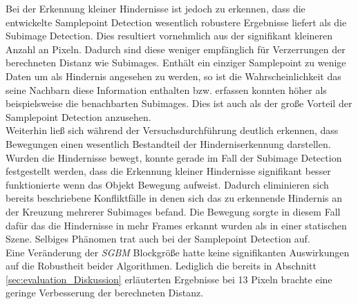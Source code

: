 \noindent
Bei der Erkennung kleiner Hindernisse ist jedoch zu erkennen, dass die entwickelte Samplepoint Detection wesentlich robustere Ergebnisse liefert als die Subimage Detection. Dies resultiert vornehmlich aus der signifikant kleineren Anzahl an Pixeln. Dadurch sind diese weniger empfänglich für Verzerrungen der berechneten Distanz wie Subimages. Enthält ein einziger Samplepoint zu wenige Daten um als Hindernis angesehen zu werden, so ist die Wahrscheinlichkeit das seine Nachbarn diese Information enthalten bzw. erfassen konnten höher als beispielsweise die benachbarten Subimages. Dies ist auch als der große Vorteil der Samplepoint Detection anzusehen.\\

\noindent
Weiterhin ließ sich während der Versuchsdurchführung deutlich erkennen, dass Bewegungen einen wesentlich Bestandteil der Hinderniserkennung darstellen. Wurden die Hindernisse bewegt, konnte gerade im Fall der Subimage Detection festgestellt werden, dass die Erkennung kleiner Hindernisse signifikant besser funktionierte wenn das Objekt Bewegung aufweist. Dadurch eliminieren sich bereits beschriebene Konfliktfälle in denen sich das zu erkennende Hindernis an der Kreuzung mehrerer Subimages befand. Die Bewegung sorgte in diesem Fall dafür das die Hindernisse in mehr Frames erkannt wurden als in einer statischen Szene. Selbiges Phänomen trat auch bei der Samplepoint Detection auf.\\

\noindent
Eine Veränderung der \emph{SGBM} Blockgröße hatte keine signifikanten Auswirkungen auf die Robustheit beider Algorithmen. Lediglich die bereits in Abschnitt \ref{sec:evaluation_Diskussion} erläuterten Ergebnisse bei 13 Pixeln brachte eine geringe Verbesserung der berechneten Distanz.\\

\noindent


 



